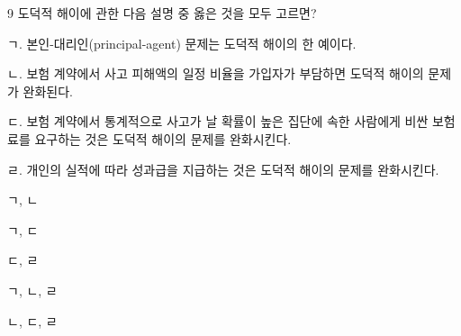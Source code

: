 \begin{question}{9}
도덕적 해이에 관한 다음 설명 중 옳은 것을 모두 고르면?
\begin{framedtext}
ㄱ. 본인-대리인(principal-agent) 문제는 도덕적 해이의 한 예이다. \par
ㄴ. 보험 계약에서 사고 피해액의 일정 비율을 가입자가 부담하면 도덕적 해이의 문제가 완화된다. \par
ㄷ. 보험 계약에서 통계적으로 사고가 날 확률이 높은 집단에 속한 사람에게 비싼 보험료를 요구하는 것은 도덕적 해이의 문제를 완화시킨다. \par
ㄹ. 개인의 실적에 따라 성과급을 지급하는 것은 도덕적 해이의 문제를 완화시킨다. \par
\end{framedtext}
\begin{choices}
  \item ㄱ, ㄴ
  \item ㄱ, ㄷ
  \item ㄷ, ㄹ
  \item ㄱ, ㄴ, ㄹ
  \item ㄴ, ㄷ, ㄹ
\end{choices}
\end{question}
